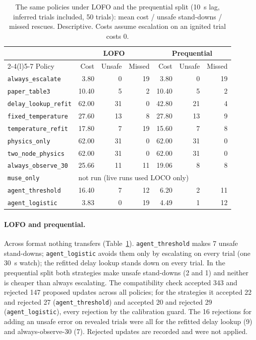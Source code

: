 \documentclass[11pt]{article}
\begin{document}
\begin{table}[t]
\centering\small
\caption{The same policies under LOFO and the prequential split (10~s lag, inferred trials included, 50 trials):
mean cost / unsafe stand-downs / missed rescues. Descriptive. Costs assume escalation on an ignited trial costs 0.}
\label{tab:lofo}
\setlength{\tabcolsep}{4pt}
\begin{tabular}{@{}lrrrrrr@{}}
\toprule
& \multicolumn{3}{c}{LOFO} & \multicolumn{3}{c}{Prequential} \\
\cmidrule(lr){2-4}\cmidrule(l){5-7}
Policy & Cost & Unsafe & Missed & Cost & Unsafe & Missed \\
\midrule
\texttt{always\_escalate} & 3.80 & 0 & 19 & 3.80 & 0 & 19 \\
\texttt{paper\_table3} & 10.40 & 5 & 2 & 10.40 & 5 & 2 \\
\texttt{delay\_lookup\_refit} & 62.00 & 31 & 0 & 42.80 & 21 & 4 \\
\texttt{fixed\_temperature} & 27.60 & 13 & 8 & 27.80 & 13 & 9 \\
\texttt{temperature\_refit} & 17.80 & 7 & 19 & 15.60 & 7 & 8 \\
\texttt{physics\_only} & 62.00 & 31 & 0 & 62.00 & 31 & 0 \\
\texttt{two\_node\_physics} & 62.00 & 31 & 0 & 62.00 & 31 & 0 \\
\texttt{always\_observe\_30} & 25.66 & 11 & 11 & 19.06 & 8 & 8 \\
\texttt{muse\_only} & \multicolumn{6}{l}{not run (live runs used LOCO only)} \\
\midrule
\texttt{agent\_threshold} & 16.40 & 7 & 12 & 6.20 & 2 & 11 \\
\texttt{agent\_logistic} & 3.83 & 0 & 19 & 4.49 & 1 & 12 \\
\bottomrule
\end{tabular}
\end{table}

\paragraph{LOFO and prequential.} Across format nothing transfers (Table~\ref{tab:lofo}). \texttt{agent\_threshold}
makes 7 unsafe stand-downs; \texttt{agent\_logistic} avoids them only by escalating on every trial (one 30~s watch);
the refitted delay lookup stands down on every trial. In the prequential split both strategies make unsafe stand-downs
(2 and 1) and neither is cheaper than always escalating. The compatibility check accepted 343 and rejected 147
proposed updates across all policies; for the strategies it accepted 22 and rejected 27 (\texttt{agent\_threshold})
and accepted 20 and rejected 29 (\texttt{agent\_logistic}), every rejection by the calibration guard. The 16 rejections for adding an unsafe error on revealed trials were all
for the refitted delay lookup (9) and always-observe-30 (7). Rejected updates are recorded and were not applied.
\end{document}
